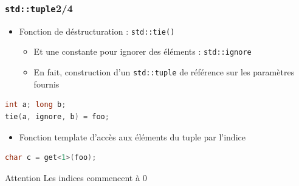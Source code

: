 \documentclass[C++.tex]{subfiles}
\begin{document}
\begin{frame}[fragile]
	\frametitle{\lstinline|std::tuple|\titlehfill{}2/4}
	\begin{itemize}
		\item Fonction de déstructuration : \lstinline|std::tie()|
		\begin{itemize}
			\item Et une constante pour ignorer des éléments : \lstinline|std::ignore|
			\item En fait, construction d'un \lstinline|std::tuple| de référence sur les paramètres fournis
		\end{itemize}
	\end{itemize}

	\begin{lstlisting}[language=C++]
int a; long b;
tie(a, ignore, b) = foo;\end{lstlisting}


	\begin{itemize}
		\item Fonction template d'accès aux éléments du tuple par l'indice
	\end{itemize}

	\begin{lstlisting}[language=C++]
char c = get<1>(foo);\end{lstlisting}

	\begin{alertblock}{Attention}
		Les indices commencent à 0
	\end{alertblock}
\end{frame}
\end{document}
